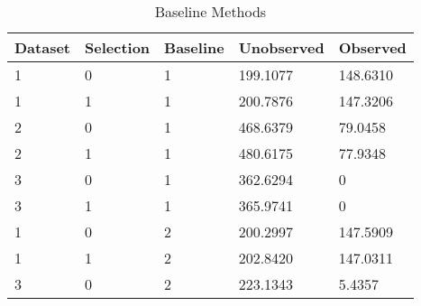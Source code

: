 \documentclass{article}
\theoremstyle{definition}
\begin{document}
\begin{table}[]
\centering
\caption{Baseline Methods}
\label{my-label}
\begin{tabular}{|l|l|l|l|l|}
\hline
\multicolumn{1}{|c|}{\textbf{Dataset}} & \multicolumn{1}{c|}{\textbf{Selection}} & \multicolumn{1}{c|}{\textbf{Baseline}} & \multicolumn{1}{c|}{\textbf{Unobserved}} & \multicolumn{1}{c|}{\textbf{Observed}} \\ \hline
1                                      & 0                                       & 1                                      & 199.1077                                 & 148.6310                               \\ \hline
1                                      & 1                                       & 1                                      & 200.7876                                 & 147.3206                               \\ \hline
2                                      & 0                                       & 1                                      & 468.6379                                 & 79.0458                                \\ \hline
2                                      & 1                                       & 1                                      & 480.6175                                 & 77.9348                                \\ \hline
3                                      & 0                                       & 1                                      & 362.6294                                 & 0                                      \\ \hline
3                                      & 1                                       & 1                                      & 365.9741                                 & 0                                      \\ \hline
1                                      & 0                                       & 2                                      & 200.2997                                 & 147.5909                               \\ \hline
1                                      & 1                                       & 2                                      & 202.8420                                 & 147.0311                               \\ \hline
3                                      & 0                                       & 2                                      & 223.1343                                 & 5.4357                                 \\ \hline

\end{tabular}
\end{table}
\end{document}
